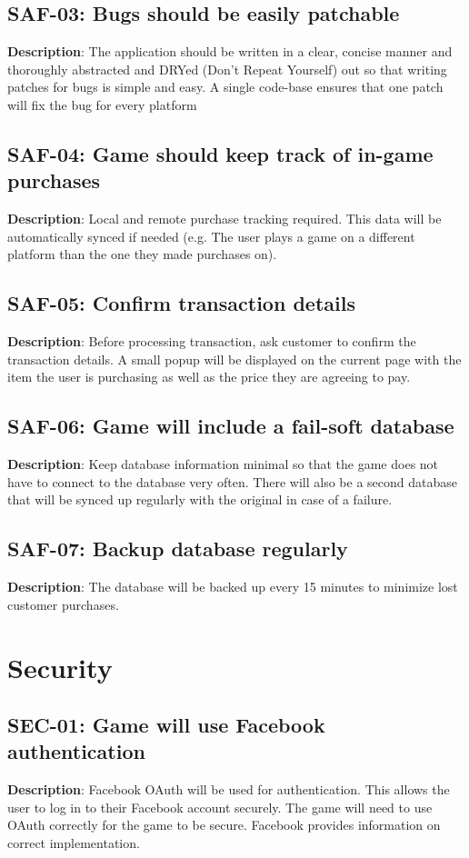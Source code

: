 \subsection{SAF-03: Bugs should be easily patchable}
\textbf{Description}: The application should be written in a clear, concise
manner and thoroughly abstracted and DRYed (Don\textquoteright{}t
Repeat Yourself) out so that writing patches for bugs is simple and
easy. A single code-base ensures that one patch will fix the bug for
every platform

\subsection{SAF-04: Game should keep track of in-game purchases}
\textbf{Description}: Local and remote purchase tracking required. This data
will be automatically synced if needed (e.g. The user plays a game
on a different platform than the one they made purchases on). 

\subsection{SAF-05: Confirm transaction details}
\textbf{Description}: Before processing transaction, ask customer to confirm
the transaction details. A small popup will be displayed on the current
page with the item the user is purchasing as well as the price they
are agreeing to pay.

\subsection{SAF-06: Game will include a fail-soft database}
\textbf{Description}: Keep database information minimal so that the game does
not have to connect to the database very often. There will also be
a second database that will be synced up regularly with the original
in case of a failure.

\subsection{SAF-07: Backup database regularly}
\textbf{Description}: The database will be backed up every 15 minutes to minimize
lost customer purchases.

\section{Security}

\subsection{SEC-01: Game will use Facebook authentication}
\textbf{Description}: Facebook OAuth will be used for authentication. This
allows the user to log in to their Facebook account securely. The
game will need to use OAuth correctly for the game to be secure. Facebook
provides information on correct implementation.

